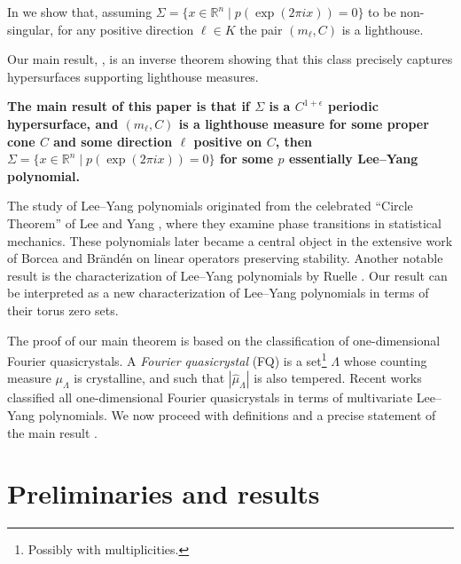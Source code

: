 \documentclass[11pt,letterpaper]{amsart}
\theoremstyle{definition}
\theoremstyle{plain}
\newcommand{\R}{{\mathbb R}}
\begin{document}
In  we show that, assuming $\Sigma=\{x\in\R^n\mid p(\exp(2\pi ix))=0\}$ to be non-singular, for any positive direction $\ell\in K$ the pair $(m_\ell,C)$ is a lighthouse. 

\medskip

Our main result, , is an inverse theorem showing that this class precisely captures hypersurfaces supporting lighthouse measures.

\medskip

\textbf{The main result of this paper is that if $\Sigma$ is a $C^{1+\epsilon}$ periodic hypersurface, and $(m_{\ell}, C)$ is a lighthouse measure for some proper cone $C$ and some direction $\ell$ positive on $C$, then $\Sigma=\{x\in\R^n\mid p(\exp(2\pi ix))=0\}$ for some $p$ essentially Lee--Yang polynomial.}

\medskip

The study of Lee--Yang polynomials originated from the celebrated ``Circle Theorem'' of Lee and Yang \cite{LeeYang1952}, where they examine phase transitions in statistical mechanics. These polynomials later became a central object in the extensive work of Borcea and Br\"and\'en \cites{borbra1,borbra2,borbra3} on linear operators preserving stability. Another notable result is the characterization of Lee--Yang polynomials by Ruelle \cite{Ruelle2010}. Our result can be interpreted as a new characterization of Lee--Yang polynomials in terms of their torus zero sets.


The proof of our main theorem is based on the classification of one-dimensional Fourier quasicrystals. A \emph{Fourier quasicrystal} (FQ) is a set\footnote{Possibly with multiplicities.} $\Lambda$ whose counting measure $\mu_{\Lambda}$ is crystalline, and such that $|\widehat{\mu}_{\Lambda}|$ is also tempered. Recent works \cites{kurasovsarnak,olevskii2020fourier,AlonCohenVinzant} classified all one-dimensional Fourier quasicrystals in terms of multivariate {Lee--Yang polynomials}. We now proceed with definitions and a precise statement of the main result .


\section{Preliminaries and results}
\end{document}
